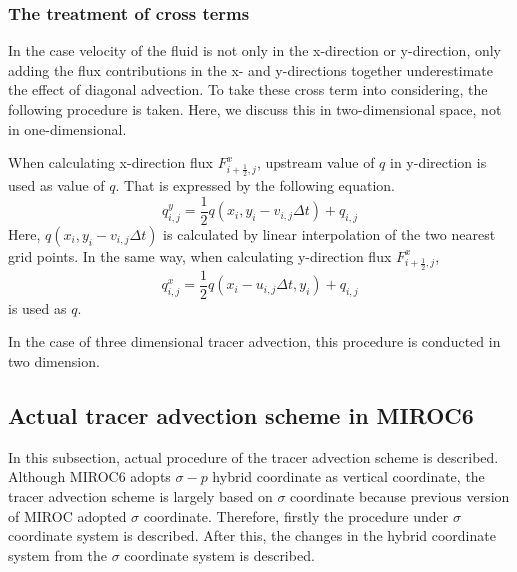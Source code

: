 \subsubsection{The treatment of cross terms}
In the case velocity of the fluid is not only in the x-direction or y-direction, only adding the flux contributions in the x- and y-directions together underestimate the effect of diagonal advection. 
To take these cross term into considering, the following procedure is taken.
Here, we discuss this in two-dimensional space, not in one-dimensional.

When calculating x-direction flux $F^{x}_{i+\frac{1}{2},j}$, upstream value of $q$ in y-direction is used as value of $q$.
That is expressed by the following equation.
  \begin{equation}
    q^{y}_{i,j}=\frac{1}{2} {q(x_{i},y_{i}-v_{i,j}\Delta t)+q_{i,j}}
  \end{equation}
Here, $q(x_{i},y_{i}-v_{i,j}\Delta t)$ is calculated by linear interpolation of the two nearest grid points.
In the same way, when calculating y-direction flux $F^{x}_{i+\frac{1}{2},j}$,
  \begin{equation}
    q^{x}_{i,j}=\frac{1}{2} {q(x_{i}-u_{i,j}\Delta t,y_{i})+q_{i,j}}
  \end{equation}
  is used as $q$.

  In the case of three dimensional tracer advection, this procedure is conducted in two dimension.
  
  \subsection{Actual tracer advection scheme in MIROC6}
  In this subsection, actual procedure of the tracer advection scheme is described.
  Although MIROC6 adopts $\sigma -p$ hybrid coordinate as vertical coordinate, the tracer advection scheme is largely based on $\sigma$ coordinate because previous version of MIROC adopted $\sigma$ coordinate. 
  Therefore, firstly the procedure under $\sigma$ coordinate system is described.
  After this, the changes in the hybrid coordinate system from the $\sigma$ coordinate system is described.
